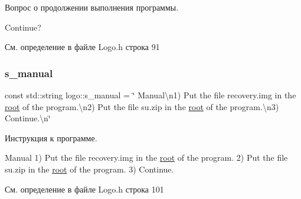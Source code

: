 Вопрос о продолжении выполнения программы. 
\begin{DoxyCode}
Continue?
\end{DoxyCode}
 

См. определение в файле Logo.\+h строка 91

\mbox{\label{namespacelogo_a0a26b9dd91d59364dce6d78c217af1a0}} 
\subsubsection{\texorpdfstring{s\+\_\+manual}{s\_manual}}
{\footnotesize\ttfamily const std\+::string logo\+::s\+\_\+manual = \char`\"{} Manual\textbackslash{}n1) Put the file recovery.\+img in the \hyperlink{_main_menu_8cpp_a784c09041cf40075e8eb016a2d8419d6}{root} of the program.\textbackslash{}n2) Put the file su.\+zip in the \hyperlink{_main_menu_8cpp_a784c09041cf40075e8eb016a2d8419d6}{root} of the program.\textbackslash{}n3) Continue.\textbackslash{}n\char`\"{}}

Инструкция к программе. 
\begin{DoxyCode}
        Manual
1) Put the file recovery.img in the \hyperlink{_main_menu_8cpp_a784c09041cf40075e8eb016a2d8419d6}{root} of the program.
2) Put the file su.zip in the \hyperlink{_main_menu_8cpp_a784c09041cf40075e8eb016a2d8419d6}{root} of the program.
3) Continue.
\end{DoxyCode}
 

См. определение в файле Logo.\+h строка 101


